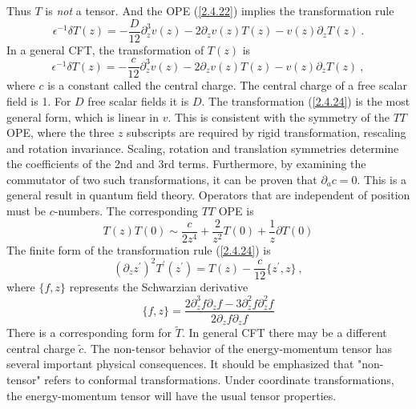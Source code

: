 Thus $T$ is \emph{not} a tensor. And the OPE (\ref{2.4.22}) implies the transformation rule    
\begin{equation}
	\epsilon^{-1} \delta T(z)=-\frac{D}{12} \partial_{z}^{3} v(z)-2 \partial_{z} v(z) T(z)-v(z) \partial_{z} T(z) \:.
	\label{2.4.23}
\end{equation}
In a general CFT, the transformation of $T(z)$ is    
\begin{equation}\label{2.4.24}
	\epsilon^{-1} \delta T(z)=-\frac{c}{12} \partial_{z}^{3} v(z)-2 \partial_{z} v(z) T(z)-v(z) \partial_{z} T(z) \:,
\end{equation}
where $c$ is a constant called the central charge. The central charge of a free scalar field is 1. For $D$ free scalar fields it is $D$. The transformation (\ref{2.4.24}) is the most general form, which is linear in $v$. This is consistent with the symmetry of the $TT$ OPE, where the three $z$ subscripts are required by rigid transformation, rescaling and rotation invariance.    
Scaling, rotation and translation symmetries determine the coefficients of the 2nd and 3rd terms. Furthermore, by examining the commutator of two such transformations, it can be proven that $\partial_{a} c=0$. This is a general result in quantum field theory. Operators that are independent of position must be $c$-numbers. The corresponding $TT$ OPE is    
\begin{equation}\label{2.4.25}
	T(z) T(0) \sim \frac{c}{2 z^{4}}+\frac{2}{z^{2}} T(0)+\frac{1}{z} \partial T(0)
\end{equation}
The finite form of the transformation rule (\ref{2.4.24}) is    
\begin{equation}\label{2.4.26}
	(\partial_{z} z^{\prime})^{2} T^{\prime}(z^{\prime})=T(z)-\frac{c}{12}\{z^{\prime}, z\} \:,
\end{equation}
where $\{f,z\}$ represents the Schwarzian derivative    
\begin{equation}
	\{f, z\}=\frac{2 \partial_{z}^{3} f \partial_{z} f-3 \partial_{z}^{2} f \partial_{z}^{2} f}{2 \partial_{z} f \partial_{z} f}
\end{equation}
There is a corresponding form for $\tilde{T}$.    
In general CFT there may be a different central charge $\tilde{c}$.    
The non-tensor behavior of the energy-momentum tensor has several important physical consequences. It should be emphasized that "non-tensor" refers to conformal transformations. Under coordinate transformations, the energy-momentum tensor will have the usual tensor properties.    

